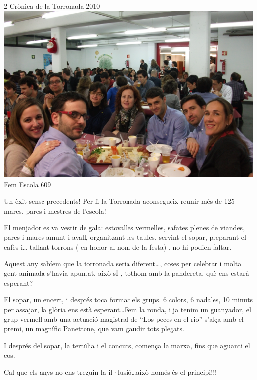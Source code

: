 \begin{news}
{2} %
{Crònica de la Torronada 2010}
{ \noindent\includegraphics[width=18.2cm,keepaspectratio]{ampa/img/DSCF0909.JPG}}
{Fem Escola}
{609} %

Un èxit sense precedents! Per fi la Torronada aconsegueix reunir més de 125 mares, pares i mestres de l’escola!

El menjador es va  vestir de gala: estovalles vermelles, safates plenes de viandes, pares i mares amunt i avall, organitzant les taules, servint el sopar, preparant el cafès i… tallant torrons ( en honor al nom de la festa) , no hi podien faltar.

Aquest any sabíem que la torronada seria diferent…, coses per celebrar i molta gent animada s’havia apuntat, això sÍ , tothom amb la pandereta, què ens estarà esperant? 

El sopar, un encert, i després toca formar els grups. 6 colors, 6 nadales, 10 minuts per assajar, la glòria ens està esperant…Fem la ronda, i ja tenim un guanyador, el grup vermell amb una actuació magistral de “Los peces en el rio” s’alça amb el premi, un magnífic Panettone, que vam gaudir  tots plegats.

I després del sopar, la tertúlia i el concurs, comença la marxa, fins que aguanti el cos.

Cal que els anys no ens treguin la il·lusió…això només és el principi!!!




\end{news}
